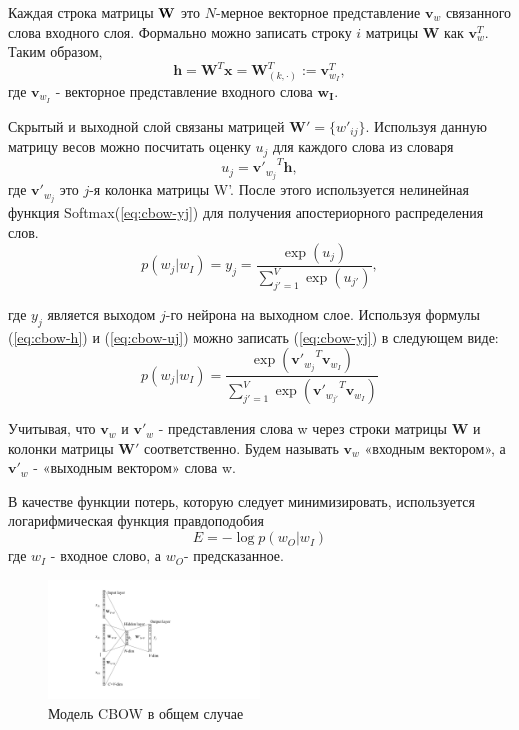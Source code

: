 Каждая строка матрицы ${\textbf W}$ это $N$-мерное векторное представление $\mathbf{v}_w$ связанного слова входного слоя. Формально можно записать строку $i$ матрицы $\textbf{W}$ как $\mathbf{v}_w^T$.
Таким образом, 
\begin{equation}
\mathbf{h} = \mathbf{W}^T \mathbf{x} = \mathbf{W}_{(k, \cdot)}^T := \mathbf{v}_{w_I}^T,
\label{eq:cbow-h}
\end{equation}
где $\mathbf{v}_{w_I}$ - векторное представление входного слова $\mathbf{w_I}$.

Скрытый и выходной слой связаны матрицей $\mathbf{W}' = \{w'_{ij}\}$. Используя данную матрицу весов можно посчитать оценку $u_j$ для каждого слова из словаря
\begin{equation}
u_j = {\mathbf{v}'_{w_j}}^T \mathbf{h},
\label{eq:cbow-uj}
\end{equation}
где  $\mathbf{v}'_{w_j}$ это $j$-я колонка матрицы W'. После этого используется нелинейная функция Softmax(\ref{eq:cbow-yj}) для получения апостериорного распределения слов.
\begin{equation}
p(w_j | w_I) = y_j = \frac{\exp(u_j)}{\sum_{j'=1}^V\exp(u_{j'})},
\label{eq:cbow-yj}
\end{equation}

где $y_j$ является выходом $j$-го нейрона на выходном слое.
Используя формулы (\ref{eq:cbow-h}) и (\ref{eq:cbow-uj}) можно записать (\ref{eq:cbow-yj}) в следующем виде:
\begin{equation}
p(w_j | w_I) = \frac{\exp\left({\mathbf{v}'_{w_j}}^T\mathbf{v}_{w_I}\right)}{\sum_{j'=1}^V\exp\left({\mathbf{v}'_{w_{j'}}}^T\mathbf{v}_{w_I}\right)}
\label{eq:cbow-pwo}
\end{equation}

Учитывая,  что $\mathbf{v}_w$ и $\mathbf{v}'_w$ - представления слова w через строки матрицы $\mathbf{W}$ и колонки матрицы $\mathbf{W'}$ соответственно. Будем называть $\mathbf{v}_w$  «входным вектором», а $\mathbf{v}'_w$ - «выходным вектором» слова w. 

В качестве функции потерь, которую следует минимизировать, используется логарифмическая функция правдоподобия
\begin{equation}
E=-\log p(w_O|w_I)
\label{eq:cbow-loss}
\end{equation}
где $w_I$ - входное слово, а $w_O$- предсказанное.

\begin{figure}[t]
\centering
\includegraphics[width=0.5\textwidth]{img/cbow-multi.pdf}
\caption{\label{fig:cbow-multi} Модель CBOW в общем случае}
\end{figure}

